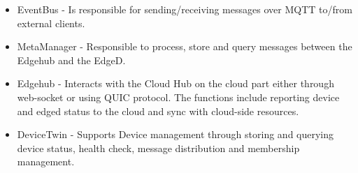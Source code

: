 \begin{flushleft}
\begin{enumerate}
\begin{itemize}
\begin{itemize}
	            \item EventBus - Is responsible for sending/receiving messages over MQTT to/from external clients.
	            \item MetaManager - Responsible to process, store and query messages between the Edgehub and the EdgeD. 
	            \item Edgehub - Interacts with the Cloud Hub on the cloud part either through web-socket or using QUIC protocol. The functions include reporting device and edged status to the cloud and sync with cloud-side resources.
		    \item DeviceTwin - Supports Device management through storing and querying device status, health check, message distribution and membership management.
		\end{itemize}
	    \end{itemize}
    \end{enumerate}
\end{flushleft}
